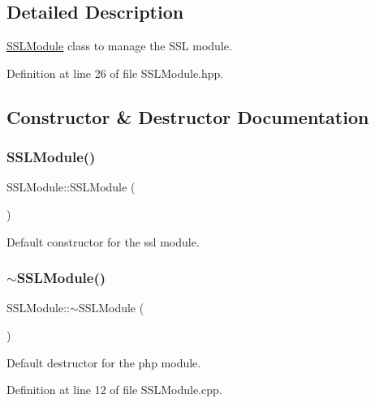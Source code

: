 \subsection{Detailed Description}
\hyperlink{class_s_s_l_module}{S\+S\+L\+Module} class to manage the S\+SL module. 

Definition at line 26 of file S\+S\+L\+Module.\+hpp.



\subsection{Constructor \& Destructor Documentation}
\mbox{\label{class_s_s_l_module_aff377c899776ca1e5ec94bb4b37e01db}} 
\subsubsection{\texorpdfstring{S\+S\+L\+Module()}{SSLModule()}}
{\footnotesize\ttfamily S\+S\+L\+Module\+::\+S\+S\+L\+Module (\begin{DoxyParamCaption}{ }\end{DoxyParamCaption})\hspace{0.3cm}{\ttfamily [default]}}



Default constructor for the ssl module. 

\mbox{\label{class_s_s_l_module_a9d8061dd774544fb6eee57803b17f83d}} 
\subsubsection{\texorpdfstring{$\sim$\+S\+S\+L\+Module()}{~SSLModule()}}
{\footnotesize\ttfamily S\+S\+L\+Module\+::$\sim$\+S\+S\+L\+Module (\begin{DoxyParamCaption}{ }\end{DoxyParamCaption})}



Default destructor for the php module. 



Definition at line 12 of file S\+S\+L\+Module.\+cpp.



